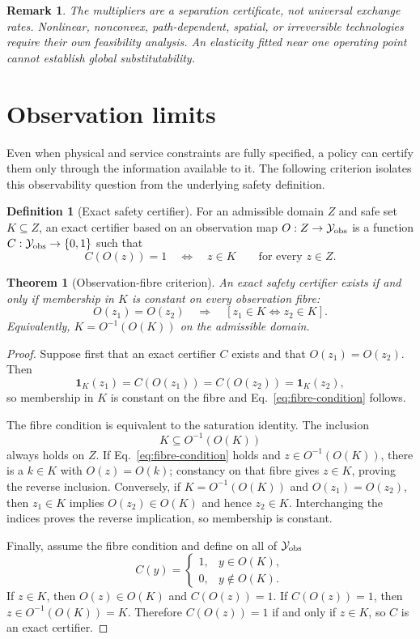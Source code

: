 \documentclass[11pt]{article}
\newtheorem{theorem}{Theorem}
\newtheorem{remark}{Remark}
\theoremstyle{definition}
\newtheorem{definition}{Definition}
\begin{document}
\begin{remark}
The multipliers are a separation certificate, not universal exchange rates. Nonlinear, nonconvex, path-dependent, spatial, or irreversible technologies require their own feasibility analysis. An elasticity fitted near one operating point cannot establish global substitutability.
\end{remark}

\section{Observation limits}

Even when physical and service constraints are fully specified, a policy can certify them only through the information available to it. The following criterion isolates this observability question from the underlying safety definition.

\begin{definition}[Exact safety certifier]
For an admissible domain $Z$ and safe set $K\subseteq Z$, an exact certifier based on an observation map $O:Z\to \mathcal Y_{\rm obs}$ is a function $C:\mathcal Y_{\rm obs}\to\{0,1\}$ such that
\[
C(O(z))=1\quad\Longleftrightarrow\quad z\in K
\qquad\text{for every }z\in Z.
\]
\end{definition}

\begin{theorem}[Observation-fibre criterion]
\label{thm:observation}
An exact safety certifier exists if and only if membership in $K$ is constant on every observation fibre:
\begin{equation}
O(z_1)=O(z_2)
\quad\Longrightarrow\quad
[z_1\in K\Longleftrightarrow z_2\in K].
\label{eq:fibre-condition}
\end{equation}
Equivalently, $K=O^{-1}(O(K))$ on the admissible domain.
\end{theorem}

\begin{proof}
Suppose first that an exact certifier $C$ exists and that $O(z_1)=O(z_2)$. Then
\[
\mathbf 1_K(z_1)=C(O(z_1))=C(O(z_2))=\mathbf 1_K(z_2),
\]
so membership in $K$ is constant on the fibre and Eq.~\eqref{eq:fibre-condition} follows.

The fibre condition is equivalent to the saturation identity. The inclusion
\[
K\subseteq O^{-1}(O(K))
\]
always holds on $Z$. If Eq.~\eqref{eq:fibre-condition} holds and $z\in O^{-1}(O(K))$, there is a $k\in K$ with $O(z)=O(k)$; constancy on that fibre gives $z\in K$, proving the reverse inclusion. Conversely, if $K=O^{-1}(O(K))$ and $O(z_1)=O(z_2)$, then $z_1\in K$ implies $O(z_2)\in O(K)$ and hence $z_2\in K$. Interchanging the indices proves the reverse implication, so membership is constant.

Finally, assume the fibre condition and define on all of $\mathcal Y_{\rm obs}$
\[
C(y)=\begin{cases}
1,&y\in O(K),\\
0,&y\notin O(K).
\end{cases}
\]
If $z\in K$, then $O(z)\in O(K)$ and $C(O(z))=1$. If $C(O(z))=1$, then $z\in O^{-1}(O(K))=K$. Therefore $C(O(z))=1$ if and only if $z\in K$, so $C$ is an exact certifier.
\end{proof}
\end{document}

